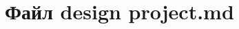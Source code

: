 \hypertarget{design_01project_8md}{\section{Файл design project.\+md}
\label{design_01project_8md}
}

